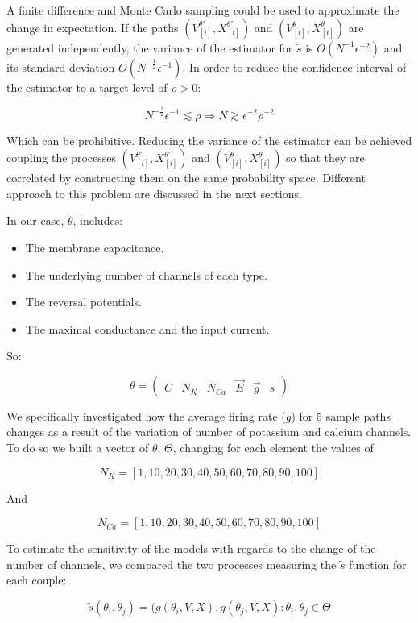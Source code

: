A finite difference and Monte Carlo sampling could be used to approximate the change in expectation.
If the paths $(V_{[i]}^{\theta'}, X_{[i]}^{\theta'})$ and $(V_{[i]}^\theta, X_{[i]}^{\theta})$ are generated independently, the variance of the estimator for $\tilde{s}$ is $O(N^{-1}\epsilon^{-2})$ and its standard deviation $O(N^{-\frac{1}{2}}\epsilon^{-1})$.
In order to reduce the confidence interval of the estimator to a target level of $\rho >0$:

$$N^{-\frac{1}{2}}\epsilon^{-1}\lesssim\rho\Rightarrow N \gtrsim\epsilon^{-2}\rho^{-2}$$

Which can be prohibitive.
Reducing the variance of the estimator can be achieved coupling the processes $(V_{[i]}^{\theta'}, X_{[i]}^{\theta'})$ and $(V_{[i]}^\theta, X_{[i]}^{\theta})$ so that they are correlated by constructing them on the same probability space.
Different approach to this problem are discussed in the next sections.

In our case, ${\theta}$, includes:

\begin{itemize}
	\item The membrane capacitance.
	\item The underlying number of channels of each type.
	\item The reversal potentials.
	\item The maximal conductance and the input current.
\end{itemize}

So:

$$\theta = \begin{pmatrix} C & N_{K} & N_{Ca} & \vec{E} & \vec{g} & s\end{pmatrix}$$

We specifically investigated how the average firing rate ($g$) for 5 sample paths changes as a result of the variation of number of potassium and calcium channels.
To do so we built a vector of $\theta$, $\Theta$, changing for each element the values of

$$N_K = [1, 10, 20, 30, 40, 50, 60, 70, 80, 90, 100]$$

And

$$N_{Ca} = [1, 10, 20, 30, 40, 50, 60, 70, 80, 90, 100]$$

To estimate the sensitivity of the models with regards to the change of the number of channels, we compared the two processes measuring the $\tilde{s}$ function for each couple:

$$\tilde{s}(\theta_i, \theta_j) = (g(\theta_i, V, X), g(\theta_j, V, X): \theta_i, \theta_j\in \Theta$$

